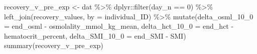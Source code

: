 \documentclass[
]{article}
\newenvironment{Shaded}{\begin{snugshade}}{\end{snugshade}}
\newcommand{\AttributeTok}[1]{\textcolor[rgb]{0.77,0.63,0.00}{#1}}
\newcommand{\DecValTok}[1]{\textcolor[rgb]{0.00,0.00,0.81}{#1}}
\newcommand{\FunctionTok}[1]{\textcolor[rgb]{0.00,0.00,0.00}{#1}}
\newcommand{\NormalTok}[1]{#1}
\newcommand{\OtherTok}[1]{\textcolor[rgb]{0.56,0.35,0.01}{#1}}
\newcommand{\SpecialCharTok}[1]{\textcolor[rgb]{0.00,0.00,0.00}{#1}}
\newcommand{\StringTok}[1]{\textcolor[rgb]{0.31,0.60,0.02}{#1}}
\begin{document}
\begin{Shaded}
\begin{Highlighting}[]
\NormalTok{recovery\_v\_pre\_exp }\OtherTok{\textless{}{-}}\NormalTok{ dat }\SpecialCharTok{\%\textgreater{}\%}
\NormalTok{  dplyr}\SpecialCharTok{::}\FunctionTok{filter}\NormalTok{(day\_n }\SpecialCharTok{==} \DecValTok{0}\NormalTok{) }\SpecialCharTok{\%\textgreater{}\%}
  \FunctionTok{left\_join}\NormalTok{(recovery\_values, }\AttributeTok{by =} \StringTok{\textquotesingle{}individual\_ID\textquotesingle{}}\NormalTok{) }\SpecialCharTok{\%\textgreater{}\%}
  \FunctionTok{mutate}\NormalTok{(}\AttributeTok{delta\_osml\_10\_0 =}\NormalTok{ end\_osml }\SpecialCharTok{{-}}\NormalTok{ osmolality\_mmol\_kg\_mean,}
         \AttributeTok{delta\_hct\_10\_0 =}\NormalTok{ end\_hct }\SpecialCharTok{{-}}\NormalTok{ hematocrit\_percent,}
         \AttributeTok{delta\_SMI\_10\_0 =}\NormalTok{ end\_SMI }\SpecialCharTok{{-}}\NormalTok{ SMI)}
\FunctionTok{summary}\NormalTok{(recovery\_v\_pre\_exp)}
\end{Highlighting}
\end{Shaded}
\end{document}
